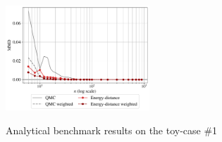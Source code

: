 \begin{figure}[!h]
\begin{center}
    \includegraphics[width=0.48\textwidth]{part2/figures/DCE/analytical_bench/Gaussian_Mixture_convergence_MMD_ED.pdf}\\
\end{center}
\caption{Analytical benchmark results on the toy-case \#1} \label{fig:toy-case1}
\end{figure}

